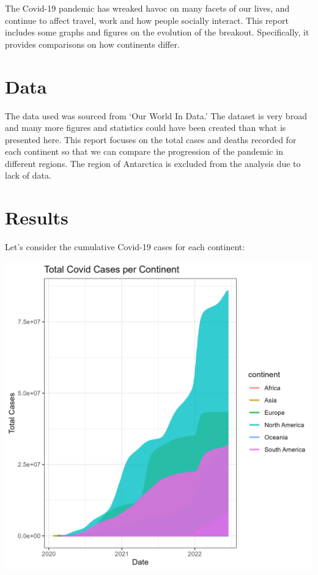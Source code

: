 \documentclass[11pt,preprint, authoryear]{elsarticle}
\numberwithin{equation}{section}
\numberwithin{figure}{section}
\numberwithin{table}{section}
\begin{document}
The Covid-19 pandemic has wreaked havoc on many facets of our lives, and
continue to affect travel, work and how people socially interact. This
report includes some graphs and figures on the evolution of the
breakout. Specifically, it provides comparisons on how continents
differ.

\hypertarget{data}{%
\section*{Data}\label{data}}

The data used was sourced from `Our World In Data.' The dataset is very
broad and many more figures and statistics could have been created than
what is presented here. This report focuses on the total cases and
deaths recorded for each continent so that we can compare the
progression of the pandemic in different regions. The region of
Antarctica is excluded from the analysis due to lack of data.

\hypertarget{results}{%
\section*{Results}\label{results}}

Let's consider the cumulative Covid-19 cases for each continent:

\hfill

\includegraphics{Figures/Figure1.png} \hfill
\end{document}
